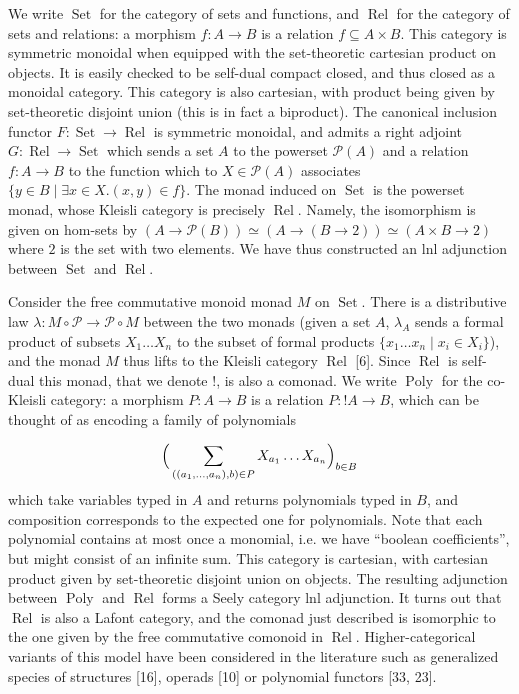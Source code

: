 \documentclass[10pt,a4paper]{article}
\begin{document}
 
We write $\operatorname{Set}$ for the category of sets and functions, and $\operatorname{Rel}$ for the category of sets and relations: a morphism $f:A\to B$ is a relation $f\subseteq A\times B$. This category is symmetric monoidal when equipped with the set-theoretic cartesian product on objects. It is easily checked to be self-dual compact closed, and thus closed as a monoidal category. This category is also cartesian, with product being given by set-theoretic disjoint union (this is in fact a biproduct). The canonical inclusion functor $F:\operatorname{Set}\to\operatorname{Rel}$ is symmetric monoidal, and admits a right adjoint $G:\operatorname{Rel}\to\operatorname{Set}$ which sends a set $A$ to the powerset $\mathcal{P}(A)$ and a relation $f:A\to B$ to the function which to $X\in\mathcal{P}(A)$ associates $\{y\in B\mid\exists x\in X.(x,y)\in f\}$. The monad induced on $\operatorname{Set}$ is the powerset monad, whose Kleisli category is precisely $\operatorname{Rel}$. Namely, the isomorphism is given on hom-sets by $(A\to\mathcal{P}(B))\simeq(A\to(B\to 2))\simeq(A\times B\to 2)$ where $2$ is the set with two elements. We have thus constructed an lnl adjunction between $\operatorname{Set}$ and $\operatorname{Rel}$.\par
 
 
 
Consider the free commutative monoid monad $M$ on $\operatorname{Set}$. There is a distributive law $\lambda:M\circ\mathcal{P}\to\mathcal{P}\circ M$ between the two monads (given a set $A$, $\lambda_{A}$ sends a formal product of subsets $X_{1}\ldots X_{n}$ to the subset of formal products $\{x_{1}\ldots x_{n}\mid x_{i}\in X_{i}\}$), and the monad $M$ thus lifts to the Kleisli category $\operatorname{Rel}$ [6]. Since $\operatorname{Rel}$ is self-dual this monad, that we denote $\mathop{!}$, is also a comonad. We write $\operatorname{Poly}$ for the co-Kleisli category: a morphism $P:A\to B$ is a relation $P:\mathop{!}A\to B$, which can be thought of as encoding a family of polynomials\par
    \[\Big{(}\sum_{((a_{1},\ldots,a_{n}),b)\in P}X_{a_{1}}\ldots X_{a_{n}}\Big{)}_{b\in B}\]    
which take variables typed in $A$ and returns polynomials typed in $B$, and composition corresponds to the expected one for polynomials. Note that each polynomial contains at most once a monomial, i.e. we have “boolean coefficients”, but might consist of an infinite sum. This category is cartesian, with cartesian product given by set-theoretic disjoint union on objects. The resulting adjunction between $\operatorname{Poly}$ and $\operatorname{Rel}$ forms a Seely category lnl adjunction. It turns out that $\operatorname{Rel}$ is also a Lafont category, and the comonad just described is isomorphic to the one given by the free commutative comonoid in $\operatorname{Rel}$. Higher-categorical variants of this model have been considered in the literature such as generalized species of structures [16], operads [10] or polynomial functors [33, 23].\par
 
\end{document}
